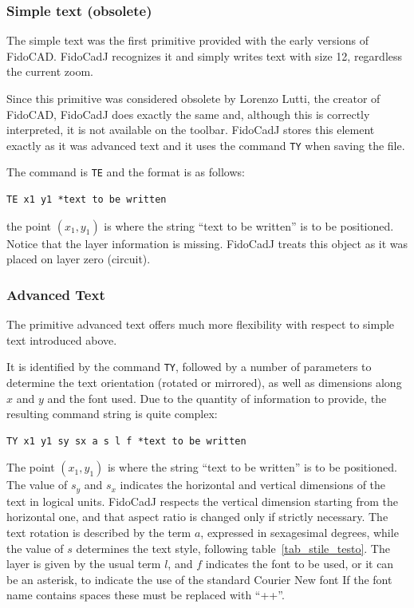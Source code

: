 \documentclass[10pt,a4paper,twoside]{scrreprt}
\begin{document}
\subsubsection{Simple text (obsolete)}

The simple text  was the first primitive provided
with the early versions of FidoCAD. FidoCadJ recognizes
it and simply writes text with size 12, regardless the current zoom.

Since this primitive was considered obsolete by Lorenzo
Lutti, the creator of FidoCAD,
FidoCadJ does exactly the same and, although this is correctly interpreted,
it is not available on the toolbar. FidoCadJ stores this element
exactly as it was advanced text and it uses the command \lstinline!TY!
when saving the file.

The command is \lstinline!TE! and the format is as follows:
\begin{lstlisting}
TE x1 y1 *text to be written
\end{lstlisting}
the point $(x_{1},y_{1})$ is where the string ``text to be written''
is to be positioned. Notice that the layer information is missing.
FidoCadJ treats this object as it was placed on layer zero (circuit).


\subsubsection{Advanced Text}

The primitive advanced text offers much more
flexibility with respect to simple text introduced
above.

It is identified by the command \lstinline!TY!, followed
by a number of parameters to determine the text orientation (rotated
or mirrored), as well as dimensions along $x$
and $y$ and the font used. Due to the quantity of information to
provide, the resulting command string is quite complex:
\begin{lstlisting}
TY x1 y1 sy sx a s l f *text to be written
\end{lstlisting}
The point $(x_{1},y_{1})$ is where the string ``text to be written''
is to be positioned. The value of $s_{y}$ and $s_{x}$ indicates the
horizontal and vertical dimensions of the text in logical units.
FidoCadJ respects the vertical dimension starting from
the horizontal one, and that aspect ratio is changed only if strictly necessary. The text rotation is described by the term
$a$, expressed in sexagesimal degrees, while the value of $s$ determines
the text style, following table~\ref{tab_stile_testo}.
The layer is given by the usual term $l$, and $f$ indicates the
font to be used, or it can be an asterisk, to indicate
the use of the standard Courier New font If the font
name contains spaces these must be replaced with ``++''\index{++}.
\end{document}
